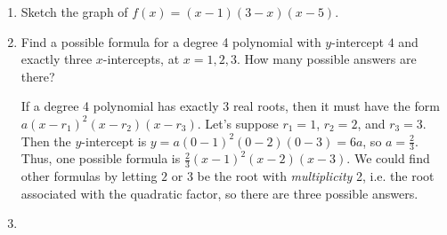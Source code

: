 \documentclass{article}
\begin{document}
\begin{enumerate}[resume, topsep=0pt]
\begin{enumerate}
    \begin{solution}
      If $f$ has degree $n$, then $f'$ has degree $n-1$, so $f'$ has
      at most $n-1$ roots, and thus $f$ has at most $n-1$ turning points.
      Also, because of the end behavior, if $n$ is even, then there must
      be an odd number of turning points, and if $n$ is odd, then there
      must be an even number of turning points.
    \end{solution}

  \end{enumerate}

\item 

  \begin{problem}[\stretch{2}]
    Sketch the graph of $f(x) = (x - 1)(3 - x)(x - 5)$.
  \end{problem}

  \begin{solution}
    \begin{center}
    \end{center}
  \end{solution}

\item 
  \begin{problem}[\vfill\newpage]
    Find a possible formula for a degree 4 polynomial with $y$-intercept $4$ and exactly three $x$-intercepts, at $x = 1, 2, 3$. How many possible answers are there?
  \end{problem}

  \begin{solution}
    If a degree 4 polynomial has exactly 3 real roots, then it
    must have the form $a(x-r_1)^2(x-r_2)(x-r_3)$. Let's suppose
    $r_1=1$, $r_2=2$, and $r_3=3$. Then the $y$-intercept is $y=a(0-1)^2(0-2)(0-3)=6a$, so $a=\frac{2}{3}$.
    Thus, one possible formula is $\frac{2}{3}(x-1)^2(x-2)(x-3)$. We
    could find other formulas by letting $2$ or $3$ be the root with
    \textit{multiplicity} 2, i.e. the root associated with the quadratic
    factor, so there are three possible answers.
  \end{solution}

\item 


\end{enumerate}
\end{document}
